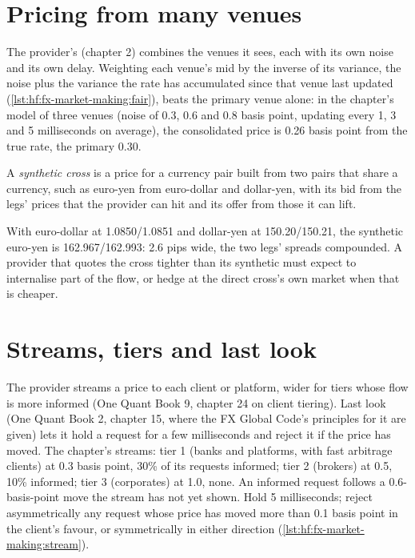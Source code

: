\section{Pricing from many venues}

The provider's  (chapter 2) combines the venues it sees, each with its own noise and its own delay. Weighting each venue's mid by the
inverse of its variance, the noise plus the variance the rate has accumulated since that venue last updated
(\cref{lst:hf:fx-market-making:fair}), beats the primary venue alone: in the chapter's model of three venues (noise of 0.3, 0.6 and 0.8 basis point,
updating every 1, 3 and 5 milliseconds on average), the consolidated price is 0.26 basis point from the true rate, the primary 0.30.

\begin{definition}\label{def:hf:fx-market-making:cross}
A \emph{synthetic cross} is a price for a currency pair built from two pairs that share a currency, such as euro-yen from
euro-dollar and dollar-yen, with its bid from the legs' prices that the provider can hit and its offer from those it can lift.
\end{definition}

With euro-dollar at 1.0850/1.0851 and dollar-yen at 150.20/150.21, the synthetic euro-yen is 162.967/162.993: 2.6 pips wide, the two legs' spreads
compounded. A provider that quotes the cross tighter than its synthetic must expect to internalise part of the flow, or hedge at the direct cross's
own market when that is cheaper.

\section{Streams, tiers and last look}

The provider streams a price to each client or platform, wider for tiers whose flow is more informed (One Quant Book 9, chapter 24 on client
tiering). Last look (One Quant Book 2, chapter 15, where the FX Global Code's principles for it are given) lets it hold a request for a few
milliseconds and reject it if the price has moved. The chapter's streams: tier 1 (banks and platforms, with fast arbitrage clients) at 0.3 basis
point, 30\% of its requests informed; tier 2 (brokers) at 0.5, 10\% informed; tier 3 (corporates) at 1.0, none. An informed request follows a
0.6-basis-point move the stream has not yet shown. Hold 5 milliseconds; reject asymmetrically any request whose price has moved more than 0.1 basis
point in the client's favour, or symmetrically in either direction (\cref{lst:hf:fx-market-making:stream}).

